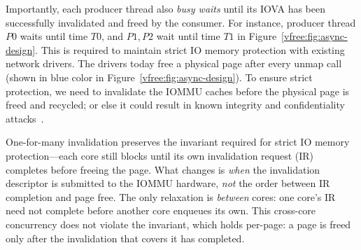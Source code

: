     Importantly, each producer thread also {\em busy waits} until its IOVA has been successfully invalidated and freed by the consumer. For instance, producer thread $P0$ waits until time $T0$, and $P1,P2$ wait until time $T1$ in Figure~\ref{vfree:fig:async-design}. This is required to maintain strict IO memory protection with existing network drivers. The drivers today free a physical page after every unmap call (shown in blue color in Figure~\ref{vfree:fig:async-design}). To ensure strict protection, we need to invalidate the IOMMU caches before the physical page is freed and recycled; or else it could result in known integrity and confidentiality attacks~\cite{RajapakshaIOMMU}. 
    
One-for-many invalidation preserves the invariant required for strict IO memory protection---each core still blocks until 
    its own invalidation request (IR) completes before freeing the page.
What changes is \emph{when} the invalidation descriptor is submitted to the IOMMU hardware, 
    {\it not} the order between IR completion and page free.
The only relaxation is \emph{between} cores: one core's IR need not complete before another core enqueues its own.
This cross-core concurrency does not violate the invariant, 
    which holds per-page: a page is freed only after the invalidation that covers it has completed. 


    
  

    

    
